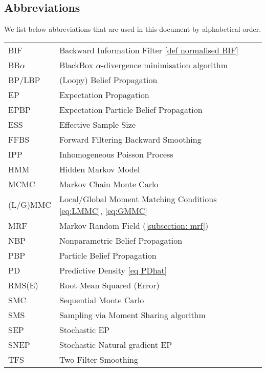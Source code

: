 %

\setlength{\tabcolsep}{6pt} %
\subsection*{Abbreviations}
We list below abbreviations that are used in this document by alphabetical order. 
\setlength{\tabcolsep}{12pt}
\renewcommand{\arraystretch}{1.2}
\begin{longtable}{ll}
BIF 			& Backward Information Filter \eqref{def normalised BIF}\\
BB$\alpha$	& BlackBox $\alpha$-divergence minimisation algorithm\\
BP/LBP 		& (Loopy) Belief Propagation\\
EP	 		& Expectation Propagation\\
EPBP 		& Expectation Particle Belief Propagation\\
ESS 			& Effective Sample Size\\
FFBS 		& Forward Filtering Backward Smoothing \\
IPP 			& Inhomogeneous Poisson Process\\
HMM 		& Hidden Markov Model\\
MCMC 		& Markov Chain Monte Carlo\\
(L/G)MMC	& Local/Global Moment Matching Conditions \eqref{eq:LMMC}, \eqref{eq:GMMC}\\
MRF 		& Markov Random Field (\ref{subsection: mrf})\\
NBP 			& Nonparametric Belief Propagation\\
PBP	 		& Particle Belief Propagation\\
PD 			& Predictive Density \eqref{eq PDhat}\\
RMS(E) 		& Root Mean Squared (Error)\\
SMC 		& Sequential Monte Carlo\\
SMS 		& Sampling via Moment Sharing algorithm\\
SEP 		& Stochastic EP\\
SNEP		& Stochastic Natural gradient EP\\
TFS 		& Two Filter Smoothing\\ 
\end{longtable}
\setlength{\tabcolsep}{6pt} %
\newpage
